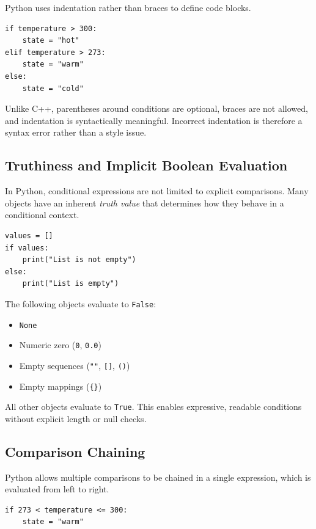 Python uses indentation rather than braces to define code blocks.

\begin{verbatim}
if temperature > 300:
    state = "hot"
elif temperature > 273:
    state = "warm"
else:
    state = "cold"
\end{verbatim}

Unlike C++, parentheses around conditions are optional, braces are not allowed, and indentation is syntactically meaningful. Incorrect indentation is therefore a syntax error rather than a style issue.

\subsection{Truthiness and Implicit Boolean Evaluation}

In Python, conditional expressions are not limited to explicit comparisons. Many objects have an inherent \emph{truth value} that determines how they behave in a conditional context.

\begin{verbatim}
values = []
if values:
    print("List is not empty")
else:
    print("List is empty")
\end{verbatim}

The following objects evaluate to \texttt{False}:
\begin{itemize}
  \item \texttt{None}
  \item Numeric zero (\texttt{0}, \texttt{0.0})
  \item Empty sequences (\texttt{""}, \texttt{[]}, \texttt{()})
  \item Empty mappings (\texttt{\{\}})
\end{itemize}

All other objects evaluate to \texttt{True}. This enables expressive, readable conditions without explicit length or null checks.

\subsection{Comparison Chaining}

Python allows multiple comparisons to be chained in a single expression, which is evaluated from left to right.

\begin{verbatim}
if 273 < temperature <= 300:
    state = "warm"
\end{verbatim}

